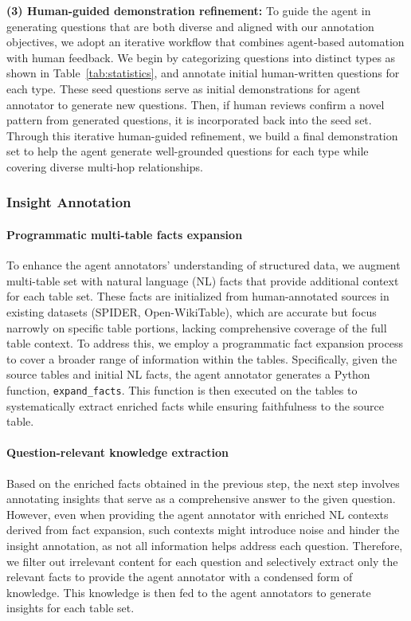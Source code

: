\textbf{(3) Human-guided  demonstration refinement:}
To guide the agent in generating questions that are both diverse and aligned with our annotation objectives, we adopt an iterative workflow that combines agent-based automation with human feedback. 
We begin by categorizing questions into distinct types as shown in Table~\ref{tab:statistics}, and annotate initial human-written questions for each type.
These seed questions serve as initial demonstrations for agent annotator to generate new questions. Then, if human reviews confirm a novel pattern from generated questions, it is incorporated back into the seed set.
Through this iterative human-guided refinement, we build a final demonstration set to help the agent generate well-grounded questions for each type while covering diverse multi-hop relationships.



\subsubsection{Insight Annotation}
\paragraph{Programmatic multi-table facts expansion}
To enhance the agent annotators' understanding of structured data, we augment multi-table set with natural language (NL) facts that provide  additional context for each table set.
These facts are initialized from human-annotated sources in existing datasets (SPIDER, Open-WikiTable), which are accurate but focus narrowly on specific table portions, lacking comprehensive coverage of the full table context. 
To address this, we employ a programmatic fact expansion process to cover a broader range of information within the tables. 
Specifically, given the source tables and initial NL facts, the agent annotator generates a Python function, \texttt{expand\_facts}. 
This function is then executed on the tables to systematically extract enriched facts while ensuring faithfulness to the source table.

\paragraph{Question-relevant knowledge extraction}
Based on the enriched facts obtained in the previous step, the next step involves annotating insights that serve as a comprehensive answer to the given question.  
However, even when providing the agent annotator with enriched NL contexts derived from fact expansion, such contexts might introduce noise and hinder the insight annotation, as not all information helps address each question.
Therefore, we filter out irrelevant content for each question and selectively extract only the relevant facts to provide the agent annotator with a condensed form of knowledge.
This knowledge is then fed to the agent annotators to generate insights for each table set.

